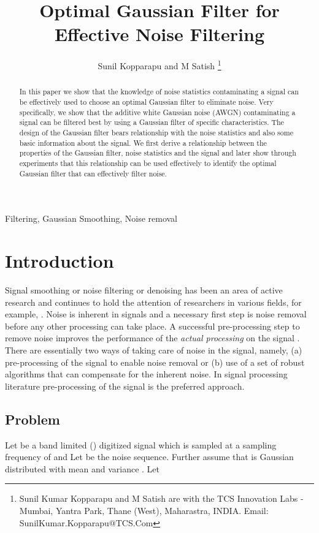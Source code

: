 \documentclass[journal,onecolumn]{IEEEtran}
\title{Optimal Gaussian Filter for Effective Noise Filtering}
\author{Sunil Kopparapu and M Satish
\thanks{Sunil Kumar Kopparapu and M Satish are with the TCS Innovation Labs - Mumbai, Yantra Park, Thane (West), Maharastra, INDIA.
Email: SunilKumar.Kopparapu@TCS.Com}}
\begin{document}
\maketitle

\doublespace
\begin{abstract}

In this paper we show that the knowledge of noise statistics 
contaminating a signal can be effectively used to choose an optimal
 Gaussian filter to 
eliminate noise. Very specifically, we show that the additive white 
Gaussian noise (AWGN) contaminating a signal can be filtered best by 
using a Gaussian filter of specific characteristics. The design of the 
Gaussian filter bears relationship with the noise 
statistics and also some basic information about the signal. We first 
derive a relationship between the properties of the Gaussian filter, 
noise statistics and the signal and later show through experiments that 
this relationship can be used effectively to identify the optimal 
Gaussian filter that can effectively filter noise.
\end{abstract}

\begin{IEEEkeywords}
Filtering, Gaussian Smoothing, Noise removal
\end{IEEEkeywords}


\section{Introduction}

Signal smoothing or noise filtering or denoising 
has been an area of active research and continues to hold 
the attention of researchers in various fields, for example,
\cite{Crisan_Kouritzin_Xiong_2008,Oktem_Egiazarian_Lukin_Ponomarenko_Tsymbal_2007,Buades_Silva_Santos_2010,Huang_Wang_Long_2009,Yang_Wei_2010}.
Noise is inherent in signals 
\cite{Bruni_Piccoli_Vitulano_2008,Narayana:2009:ENM:1946497.1946503}
and a necessary first step is noise removal before any other processing can
take place. A successful pre-processing step to remove noise improves the
performance of the {\em actual processing} on the signal \cite{lajish_2010}.
There are essentially two ways of taking
care of noise in the signal, namely, (a) pre-processing of the signal to
enable noise removal or (b) use of a set of robust algorithms that can
compensate for the inherent noise. In signal processing 
literature pre-processing of the signal is
the preferred approach.

\subsection{Problem}
\label{sec:problem}
Let  be a band 
limited () 
digitized signal which is sampled at a sampling frequency of  and
Let 
 be the noise sequence.
Further assume that  is 
Gaussian distributed with mean  and variance 
. Let 
  
\end{document}
